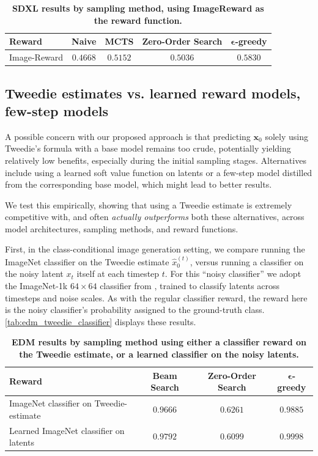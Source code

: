 \documentclass{article}
\begin{document}
\begin{table}[h]
  \centering
  \caption{\small \textbf{SDXL results by sampling method, using ImageReward \citep{xu2023imagerewardlearningevaluatinghuman} as the reward function.}}
  \label{tab:sdxl_imagereward}
  \begin{tabular}{lcccc}
    \toprule
    \textbf{Reward} & \textbf{Naive} & \textbf{MCTS} & \textbf{Zero-Order Search} & $\bm{\epsilon}$\textbf{-greedy} \\
    \midrule
    Image-Reward & $0.4668$ & $0.5152$ & $0.5036$ & $\mathbf{0.5830}$ \\
    \bottomrule
  \end{tabular}
\end{table}

\subsection{Tweedie estimates vs. learned reward models, few-step models}

A possible concern with our proposed approach is that predicting $\mathbf{x}_0$ solely using Tweedie's formula with a base model remains too crude, potentially yielding relatively low benefits, especially during the initial sampling stages. Alternatives include using a learned soft value function on latents or a few-step model distilled from the corresponding base model, which might lead to better results.

We test this empirically, showing that using a Tweedie estimate is extremely competitive with, and often \textit{actually outperforms} both these alternatives, across model architectures, sampling methods, and reward functions.

First, in the class-conditional image generation setting, we compare running the ImageNet classifier on the Tweedie estimate $\hat{x}_0^{(t)}$, versus running a classifier on the noisy latent $x_t$ itself at each timestep $t$. For this ``noisy classifier'' we adopt the ImageNet-1k $64 \times 64$ classifier from \cite{dhariwal2021diffusionmodelsbeatgans}, trained to classify latents across timesteps and noise scales. As with the regular classifier reward, the reward here is the noisy classifier’s probability assigned to the ground-truth class. \autoref{tab:edm_tweedie_classifier} displays these results.

\begin{table}[h]
  \centering
  \caption{\small \textbf{EDM results by sampling method using either a classifier reward on the Tweedie estimate, or a learned classifier on the noisy latents.}}
  \label{tab:edm_tweedie_classifier}
  \begin{tabular}{lccc}
    \toprule
    \textbf{Reward} & \textbf{Beam Search} & \textbf{Zero-Order Search} & $\bm{\epsilon}$\textbf{-greedy} \\
    \midrule
    ImageNet classifier on Tweedie-estimate & $0.9666$ & $\mathbf{0.6261}$ & $0.9885$ \\
    Learned ImageNet classifier on latents & $\mathbf{0.9792}$ & $0.6099$ & $\mathbf{0.9998}$ \\
    \bottomrule
  \end{tabular}
\end{table}
\end{document}
